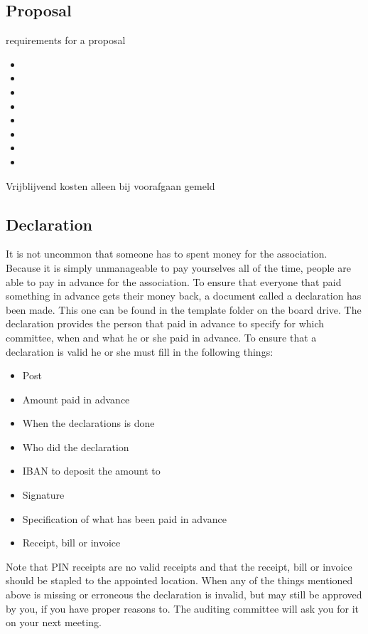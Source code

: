 \documentclass{report}
\begin{document}
\subsection{Proposal} %
requirements for a proposal
\begin{itemize}
	\item 
	\item 
	\item 
	\item 
	\item 
	\item 
	\item 
	\item 
\end{itemize}
Vrijblijvend
kosten alleen bij voorafgaan gemeld

\subsection{Declaration}
It is not uncommon that someone has to spent money for the association. Because it is simply unmanageable to pay yourselves all of the time, people are able to pay in advance for the association. To ensure that everyone that paid something in advance gets their money back, a document called a declaration has been made. This one can be found in the template folder on the board drive. The declaration provides the person that paid in advance to specify for which committee, when and what he or she paid in advance. To ensure that a declaration is valid he or she must fill in the following things:
\begin{itemize}
\item Post
\item Amount paid in advance
\item When the declarations is done
\item Who did the declaration
\item IBAN to deposit the amount to
\item Signature
\item Specification of what has been paid in advance
\item Receipt, bill or invoice
\end{itemize}
Note that PIN receipts are no valid receipts and that the receipt, bill or invoice should be stapled to the appointed location. When any of the things mentioned above is missing or erroneous the declaration is invalid, but may still be approved by you, if you have proper reasons to. The auditing committee will ask you for it on your next meeting.  
   
\end{document}
